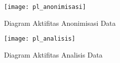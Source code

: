 \begin{figure}[H]
	\centering
	\texttt{[image: pl\_anonimisasi]}
	\caption{Diagram Aktifitas Anonimisasi Data}
	\label{fig:pl_anonimisasi}
\end{figure}

\begin{figure}[H]
	\centering
	\texttt{[image: pl\_analisis]}
	\caption{Diagram Aktifitas Analisis Data}
	\label{fig:pl_analisis}
\end{figure}